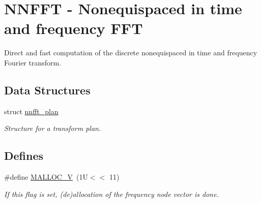 \hypertarget{group__nnfft}{
\section{NNFFT - Nonequispaced in time and frequency FFT}
\label{group__nnfft}
}
Direct and fast computation of the discrete nonequispaced in time and frequency Fourier transform.  
\subsection*{Data Structures}
\begin{CompactItemize}
\item 
struct \hyperlink{structnnfft__plan}{nnfft\_\-plan}
\begin{CompactList}\small\item\em Structure for a transform plan. \item\end{CompactList}\end{CompactItemize}
\subsection*{Defines}
\begin{CompactItemize}
\item 
\#define \hyperlink{group__nnfft_ga11}{MALLOC\_\-V}~(1U$<$$<$ 11)
\begin{CompactList}\small\item\em If this flag is set, (de)allocation of the frequency node vector is done. \item\end{CompactList}\end{CompactItemize}
